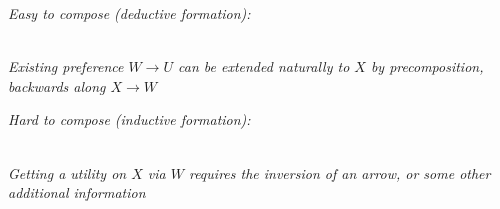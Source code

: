 \documentclass{article}
\begin{document}
	\begin{minipage}{0.48\linewidth}\centering
		\textit{Easy to compose (deductive formation):}\\[0.5em]
		\\
		\textit{\small Existing preference $W\to U$ can be extended naturally to $X$ by precomposition, backwards along $X \to W$}
	\end{minipage}
	\hfill
	\begin{minipage}{0.48\linewidth}\centering
		\textit{Hard to compose (inductive formation):}\\[0.5em]
		\\
		\textit{\small Getting a utility on $X$ via $W$ requires the inversion of an arrow, or some other additional information}
	\end{minipage}
	\vspace{1em}
	
%			
%							
	
\end{document}
